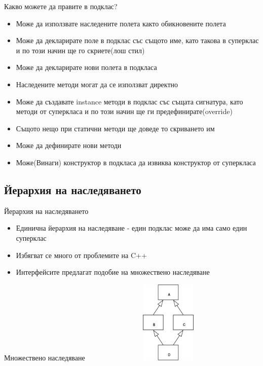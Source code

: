 \documentclass{beamer}
\begin{document}
\begin{frame}{Какво можете да правите в подклас?}
  \transdissolve
  \begin{itemize}
  \item Може да използвате наследените полета както обикновените
    полета \pause
  \item Може да декларирате поле в подклас със същото име, като такова
    в суперклас и по този начин ще го скриете(лош стил) \pause
  \item Може да декларирате нови полета в подкласа \pause
  \item Наследените методи могат да се използват директно \pause
  \item Може да създавате instance методи в подклас със същата
    сигнатура, като методи от суперкласа и по този начин ще ги
    предефинирате(override) \pause
  \item Същото нещо при статични методи ще доведе то скриването им \pause
  \item Може да дефинирате нови методи \pause
  \item Може(Винаги) конструктор в подкласа да извиква конструктор от
    суперкласа
  \end{itemize}
\end{frame}

\subsection{Йерархия на наследяването}
\begin{frame}{Йерархия на наследяването}
  \transdissolve
  \begin{itemize}
  \item Единична йерархия на наследяване - един подклас може да има
    само един суперклас \pause
  \item Избягват се много от проблемите на C++ \pause
  \item Интерфейсите предлагат подобие на множествено наследяване
  \end{itemize}
\end{frame}

\begin{frame}{Множествено наследяване}
  \transdissolve
  \includegraphics[width=320px, height=150px]{images/diamond_inheritance.png}
\end{frame}
\end{document}
